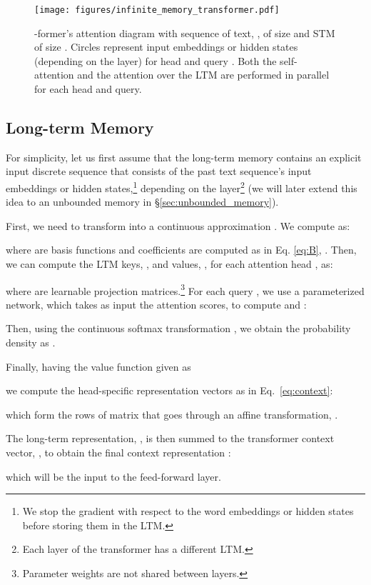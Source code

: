 \documentclass[11pt]{article}
\begin{document}
\begin{figure}[t]
    \centering
    \texttt{[image: figures/infinite\_memory\_transformer.pdf]}
    \caption{\mbox{-former's} attention diagram with sequence of text, , of size  and STM of size . Circles represent input embeddings or hidden states (depending on the layer) for head  and query . Both the self-attention and the attention over the LTM are performed in parallel for each head and query.}
    \label{fig:infinite_transformer}
\end{figure}

\subsection{Long-term Memory}
\label{sec:ltm}

For simplicity, let us first assume that the long-term memory contains an explicit input discrete sequence  that consists of the past text sequence's input embeddings or hidden states,\footnote{We stop the gradient with respect to the word embeddings or hidden states before storing them in the LTM.} depending on the layer\footnote{Each layer of the transformer has a different LTM.} (we will later extend this idea to an unbounded memory in \S\ref{sec:unbounded_memory}).

First, we need to transform  into a continuous approximation . 
We compute  as:

where  are basis functions and coefficients  are computed as in Eq. \ref{eq:B},
    .
Then, we can compute the LTM keys, , and values, , for each attention head , as: 

where   are learnable projection matrices.\footnote{Parameter weights are not shared between layers.}
For each query , we use a parameterized network, which takes as input the attention scores, to compute 
and :


Then, using the continuous softmax transformation \citep{martins2020sparse}, we obtain the probability density  as .

Finally, having the value function  given as
    
we compute the head-specific representation vectors as in Eq.~\ref{eq:context}:

which form the rows of matrix  that goes through an affine transformation, .

The long-term representation, , is then summed to the transformer context vector, 
, to obtain the final context representation :

which will be the input to the feed-forward layer.
\end{document}
